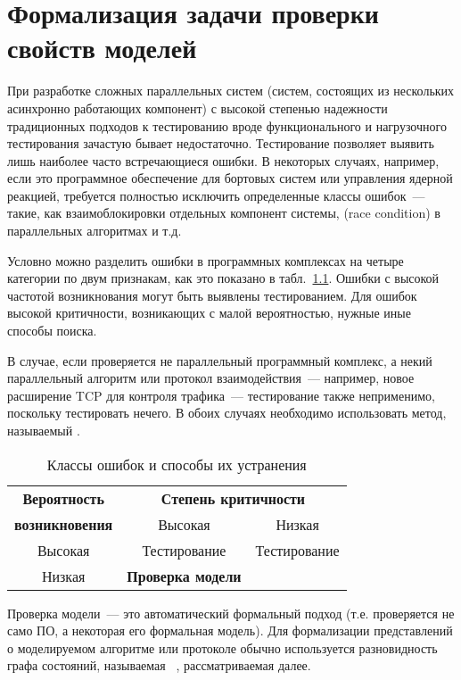\chapter{Формализация задачи проверки свойств моделей}
\label{cha:model-checking}

При разработке сложных параллельных систем (систем, состоящих из нескольких асинхронно
работающих компонент) с высокой степенью надежности традиционных подходов к тестированию
вроде функционального и нагрузочного тестирования зачастую бывает
недостаточно. Тестирование позволяет выявить лишь наиболее часто встречающиеся ошибки. В
некоторых случаях, например, если это программное обеспечение для бортовых систем или
управления ядерной реакцией, требуется полностью исключить определенные классы ошибок~---
такие, как взаимоблокировки отдельных компонент системы,  (race condition) в
параллельных алгоритмах и т.д.

Условно можно разделить ошибки в программных комплексах на четыре категории по двум признакам, как
это показано в табл.~\ref{tab:error-classes}. Ошибки с высокой частотой возникнования
могут быть выявлены тестированием. Для ошибок высокой критичности, возникающих с малой
вероятностью, нужные иные способы поиска.

В случае, если проверяется не параллельный программный комплекс, а некий параллельный
алгоритм или протокол взаимодействия~--- например, новое расширение TCP для контроля
трафика~--- тестирование также неприменимо, поскольку тестировать нечего. В обоих случаях
необходимо использовать метод, называемый .

\begin{table}[hb]
  \centering
  \begin{tabular}{|c|c|c|} \hline
    \textbf{Вероятность} & \multicolumn{2}{|c|}{\bf Степень критичности} \\ \cline{2-3}
    \textbf{возникновения} & Высокая & Низкая \\ \hline
    Высокая & Тестирование & Тестирование \\  \hline
    Низкая  & \textbf{Проверка модели} &  \\  \hline
  \end{tabular}  \caption{Классы ошибок и способы их устранения}
  \label{tab:error-classes}
\end{table}

Проверка модели~--- это автоматический формальный подход (т.е. проверяется не само ПО, а
некоторая его формальная модель). Для формализации представлений о моделируемом алгоритме
или протоколе обычно используется разновидность графа состояний, называемая ~\cite{Clarke}, рассматриваемая далее.

